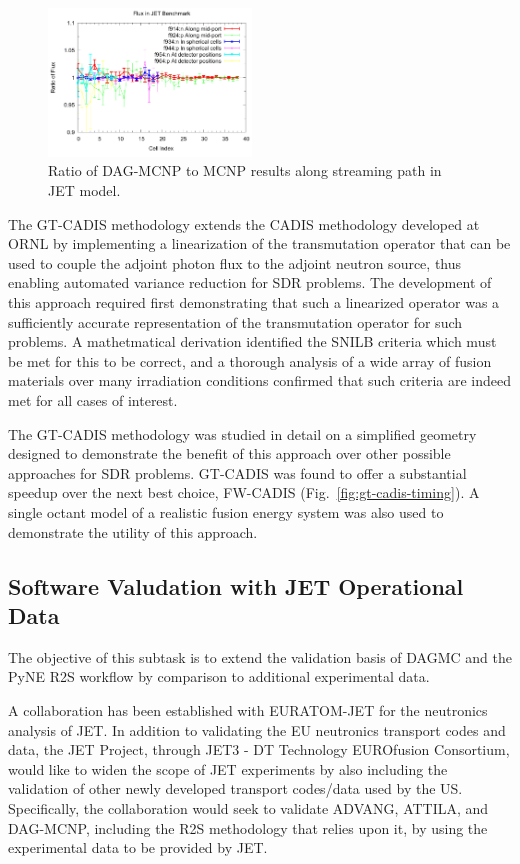 \begin{figure}
\centering
\includegraphics[width=0.48\textwidth]{imgs/jet-streaming-benchmark.png}
\caption{\label{fig:jet-streaming-benchmark}Ratio of DAG-MCNP to MCNP results
  along streaming path in JET model.}
\end{figure}

The \gls{GT-CADIS} methodology extends the \gls{CADIS} methodology developed
at \gls{ORNL} by implementing a linearization of the transmutation operator
that can be used to couple the adjoint photon flux to the adjoint neutron
source, thus enabling automated variance reduction for \gls{SDR} problems.
The development of this approach required first demonstrating that such a
linearized operator was a sufficiently accurate representation of the
transmutation operator for such problems.  A mathetmatical derivation
identified the \gls{SNILB} criteria which must be met for this to be correct,
and a thorough analysis of a wide array of fusion materials over many
irradiation conditions confirmed that such criteria are indeed met for all
cases of interest.

The \gls{GT-CADIS} methodology was studied in detail on a simplified geometry
designed to demonstrate the benefit of this approach over other possible
approaches for \gls{SDR} problems.  \gls{GT-CADIS} was found to offer a
substantial speedup over the next best choice, \gls{FW-CADIS}
(Fig.\ \ref{fig:gt-cadis-timing}).  A single octant model of a realistic fusion
energy system was also used to demonstrate the utility of this approach.

\subsection{Software Valudation with JET Operational Data}

The objective of this subtask is to extend the validation basis of \gls{DAGMC}
and the PyNE \gls{R2S} workflow by comparison to additional experimental data.

A collaboration has been established with EURATOM-JET for the neutronics
analysis of JET.  In addition to validating the EU neutronics transport codes
and data, the JET Project, through JET3 - DT Technology EUROfusion Consortium,
would like to widen the scope of JET experiments by also including the
validation of other newly developed transport codes/data used by the US.
Specifically, the collaboration would seek to validate ADVANG, ATTILA, and
DAG-MCNP, including the \gls{R2S} methodology that relies upon it, by using
the experimental data to be provided by JET.

